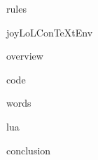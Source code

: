 
\usemodule[t-diSimp]

\startDiSimpComponent rules

\diSimpEnvironment joyLoLConTeXtEnv

\startJoyLoLCoAlg[title=JoyLoL rules][rules]

\diSimpComponent overview

\diSimpComponent code

\diSimpComponent words

\diSimpComponent lua

\diSimpComponent conclusion

\stopJoyLoLCoAlg

\stopDiSimpComponent
